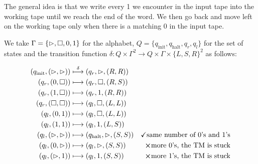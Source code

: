 \begin{solution}
	The general idea is that we write every 1 we encounter in the input tape into the working tape until we reach the end of the word. We then go back and move left on the working tape only when there is a matching 0 in the input tape.

	We take $\Gamma = \{\rhd,\square,0,1\}$ for the alphabet, $Q = \{q_{\text{init}},q_{\text{halt}},q_r,q_l\}$ for the set of states and the transition function $\delta: Q \times \Gamma^2 \to Q \times \Gamma \times \{L,S,R\}^2$ as follows:

	\begin{align*}
		(q_{\text{init}},(\rhd,\rhd)) & \overset{\delta}{\longmapsto} (q_r,\rhd,(R,R))                                              \\
		(q_r,(0,\square))                  & \longmapsto (q_r,\square,(R,S))                                                                \\
		(q_r,(1,\square))                  & \longmapsto (q_r,1,(R,R))                                                                     \\
		(q_r,(\square,\square))             & \longmapsto (q_l,\square,(L,L))                                                                \\
		(q_l,(0,1))                       & \longmapsto (q_l,\square,(L,L))                                                                \\
		(q_l,(1,1))                       & \longmapsto (q_l,1,(L,S))                                                                     \\
		(q_l,(\rhd,\rhd))             & \longmapsto (q_{\text{halt}},\rhd,(S,S))       & \checkmark \text{same number of 0's and 1's} \\
		(q_l,(0,\rhd))                  & \longmapsto (q_l,\rhd,(S,S))                   & \bm{\times} \text{more 0's, the TM is stuck}     \\
		(q_l,(\rhd,1))                  & \longmapsto (q_l,1,(S,S))                        & \bm{\times} \text{more 1's, the TM is stuck}
	\end{align*}
\end{solution}

